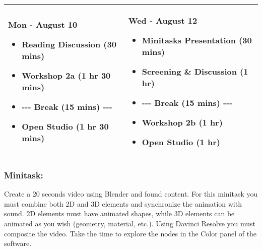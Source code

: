 \documentclass[10pt,letter,english]{article}
\begin{document}
\begin{longtable}[]{@{}ll@{}}
      \toprule
      \endhead
      \begin{minipage}[t]{0.47\columnwidth}\raggedright
            \textbf{{Mon - August 10}}

            \begin{itemize}
                  \item
                        Reading Discussion (30 mins)
                  \item
                        Workshop 2a (1 hr 30 mins)
                  \item
                        -\/-\/- Break (15 mins) -\/-\/-
                  \item
                        Open Studio (1 hr 30 mins)
            \end{itemize}\strut
      \end{minipage} & \begin{minipage}[t]{0.47\columnwidth}\raggedright
            \textbf{{Wed - August 12}}

            \begin{itemize}
                  \item
                        Minitasks Presentation (30 mins)
                  \item
                        Screening \& Discussion (1 hr)
                  \item
                        -\/-\/- Break (15 mins) -\/-\/-
                  \item
                        Workshop 2b (1 hr)
                  \item
                        Open Studio (1 hr)
            \end{itemize}\strut
      \end{minipage}\tabularnewline
      \bottomrule
\end{longtable}

\hypertarget{minitask-1}{%
      \subsubsection*{\texorpdfstring{Minitask:
            }{Minitask: }}\label{minitask-1}}
Create a 20 seconds video using Blender and found content. For this minitask you must combine both 2D and 3D elements and synchronize the animation with sound. 2D elements must have animated shapes, while 3D elements can be animated as you wish (geometry, material, etc.). Using Davinci Resolve you must composite the video. Take the time to explore the nodes in the Color panel of the software.
\end{document}

